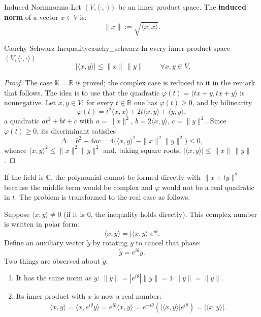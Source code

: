 \documentclass[11pt, a4paper]{article}
\begin{document}
\begin{definicion}{Induced Norm}{norma}
Let $(V,\langle\cdot,\cdot\rangle)$ be an inner product space. The \textbf{induced norm} of a vector $x \in V$ is:
\[
\|x\| := \sqrt{\langle x,x\rangle}.
\]
\end{definicion}

\begin{proposicion}{Cauchy-Schwarz Inequality}{cauchy_schwarz}
In every inner product space $(V,\langle\cdot,\cdot\rangle)$
\[
\;|\langle x,y\rangle| \le \|x\|\,\|y\|\; \qquad\forall x,y\in V.
\]
\end{proposicion}

\begin{proof}
The case $\mathbb{K} = \mathbb{R}$ is proved; the complex case is reduced to it in the remark
that follows. The idea is to use that the quadratic $\varphi(t) = \langle tx+y, tx+y\rangle$ is nonnegative. Let
$x, y \in V$; for every $t \in \mathbb{R}$ one has $\varphi(t) \ge 0$, and by bilinearity
\[
\varphi(t) = t^2\langle x,x\rangle + 2t\langle x,y\rangle + \langle y,y\rangle,
\]
a quadratic $a t^2 + b t + c$ with $a = \|x\|^2$, $b = 2\langle x,y\rangle$, $c = \|y\|^2$. Since
$\varphi(t)\ge 0$, its discriminant satisfies
\[
\Delta = b^2 - 4ac = 4\Big(\langle x,y\rangle^2 - \|x\|^2\|y\|^2\Big) \le 0,
\]
whence $\langle x,y\rangle^2 \le \|x\|^2\|y\|^2$ and, taking square roots, $|\langle x,y\rangle| \le \|x\|\,\|y\|$.
\end{proof}

\obs
If the field is $\mathbb{C}$, the polynomial cannot be formed directly with $\|x+ty\|^2$ because the middle term would be complex and $\varphi$ would not be a real quadratic in $t$. The problem is transformed to the real case as follows.

Suppose $\langle x, y \rangle \neq 0$ (if it is $0$, the inequality holds directly). This complex number is written in polar form:
\[
\langle x, y \rangle = |\langle x, y \rangle| e^{i\theta}.
\]
Define an auxiliary vector $\tilde{y}$ by rotating $y$ to cancel that phase:
\[
\tilde{y} = e^{i\theta} y.
\]
Two things are observed about $\tilde{y}$:
\begin{enumerate}
    \item It has the same norm as $y$: $\|\tilde{y}\| = |e^{i\theta}| \|y\| = 1 \cdot \|y\| = \|y\|$.
    \item Its inner product with $x$ is now a real number:
    \[
    \langle x, \tilde{y} \rangle = \langle x, e^{i\theta} y \rangle = \overline{e^{i\theta}} \langle x, y \rangle = e^{-i\theta} \left( |\langle x, y \rangle| e^{i\theta} \right) = |\langle x, y \rangle|.
    \]
\end{enumerate}
\end{document}
